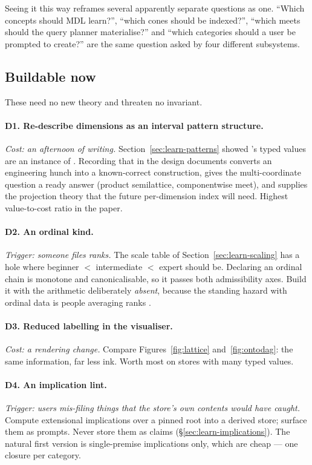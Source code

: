 Seeing it this way reframes several apparently separate questions as one.
``Which concepts should MDL learn?'', ``which cones should be indexed?'',
``which meets should the query planner materialise?'' and ``which categories
should a user be prompted to create?'' are the same question asked by four
different subsystems.

\subsection{Buildable now}

These need no new theory and threaten no invariant.

\paragraph{D1. Re-describe dimensions as an interval pattern structure.}
\emph{Cost: an afternoon of writing.} Section~\ref{sec:learn-patterns} showed
\odag{}'s typed values are an instance of \citet{ganter2001}. Recording that
in the design documents converts an engineering hunch into a known-correct
construction, gives the multi-coordinate question a ready answer (product
semilattice, componentwise meet), and supplies the projection theory that the
future per-dimension index will need. Highest value-to-cost ratio in the
paper.

\paragraph{D2. An ordinal kind.} \emph{Trigger: someone files ranks.} The
scale table of Section~\ref{sec:learn-scaling} has a hole where
\textsf{beginner} $<$ \textsf{intermediate} $<$ \textsf{expert} should be.
Declaring an ordinal chain is monotone and canonicalisable, so it passes both
admissibility axes. Build it with the arithmetic deliberately \emph{absent},
because the standing hazard with ordinal data is people averaging ranks
\citep{stevens1946}.

\paragraph{D3. Reduced labelling in the visualiser.} \emph{Cost: a rendering
change.} Compare Figures~\ref{fig:lattice} and~\ref{fig:ontodag}: the same
information, far less ink. Worth most on stores with many typed values.

\paragraph{D4. An implication lint.} \emph{Trigger: users mis-filing things
that the store's own contents would have caught.} Compute extensional
implications over a pinned root into a derived store; surface them as prompts.
Never store them as claims (\S\ref{sec:learn-implications}). The natural first
version is single-premise implications only, which are cheap --- one closure
per category.

